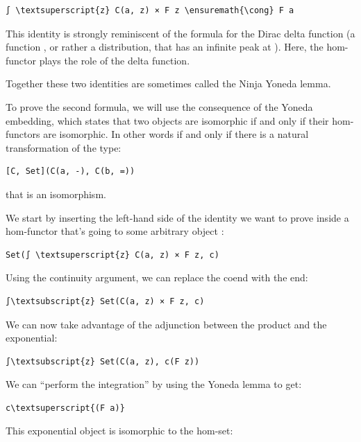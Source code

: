 \begin{Verbatim}[commandchars=\\\{\}]
∫ \textsuperscript{z} C(a, z) × F z \ensuremath{\cong} F a
\end{Verbatim}
This identity is strongly reminiscent of the formula for the Dirac delta
function (a function , or rather a distribution, that
has an infinite peak at ). Here, the hom-functor plays
the role of the delta function.

Together these two identities are sometimes called the Ninja Yoneda
lemma.

To prove the second formula, we will use the consequence of the Yoneda
embedding, which states that two objects are isomorphic if and only if
their hom-functors are isomorphic. In other words  if
and only if there is a natural transformation of the type:

\begin{verbatim}
[C, Set](C(a, -), C(b, =))
\end{verbatim}
that is an isomorphism.

We start by inserting the left-hand side of the identity we want to
prove inside a hom-functor that's going to some arbitrary object
:

\begin{Verbatim}[commandchars=\\\{\}]
Set(∫ \textsuperscript{z} C(a, z) × F z, c)
\end{Verbatim}
Using the continuity argument, we can replace the coend with the end:

\begin{Verbatim}[commandchars=\\\{\}]
∫\textsubscript{z} Set(C(a, z) × F z, c)
\end{Verbatim}
We can now take advantage of the adjunction between the product and the
exponential:

\begin{Verbatim}[commandchars=\\\{\}]
∫\textsubscript{z} Set(C(a, z), c(F z))
\end{Verbatim}
We can ``perform the integration'' by using the Yoneda lemma to get:

\begin{Verbatim}[commandchars=\\\{\}]
c\textsuperscript{(F a)}
\end{Verbatim}
This exponential object is isomorphic to the hom-set:

